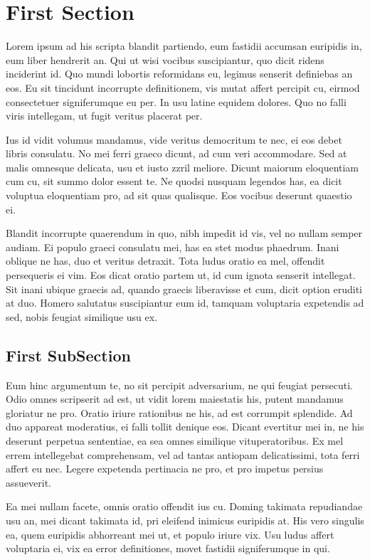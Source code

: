 \section{First Section \label{sec:sec1}}
Lorem ipsum ad his scripta blandit partiendo, eum fastidii accumsan euripidis in, eum liber hendrerit an. Qui ut wisi vocibus suscipiantur, quo dicit ridens inciderint id. Quo mundi lobortis reformidans eu, legimus senserit definiebas an eos. Eu sit tincidunt incorrupte definitionem, vis mutat affert percipit cu, eirmod consectetuer signiferumque eu per. In usu latine equidem dolores. Quo no falli viris intellegam, ut fugit veritus placerat per.

Ius id vidit volumus mandamus, vide veritus democritum te nec, ei eos debet libris consulatu. No mei ferri graeco dicunt, ad cum veri accommodare. Sed at malis omnesque delicata, usu et iusto zzril meliore. Dicunt maiorum eloquentiam cum cu, sit summo dolor essent te. Ne quodsi nusquam legendos has, ea dicit voluptua eloquentiam pro, ad sit quas qualisque. Eos vocibus deserunt quaestio ei.

Blandit incorrupte quaerendum in quo, nibh impedit id vis, vel no nullam semper audiam. Ei populo graeci consulatu mei, has ea stet modus phaedrum. Inani oblique ne has, duo et veritus detraxit. Tota ludus oratio ea mel, offendit persequeris ei vim. Eos dicat oratio partem ut, id cum ignota senserit intellegat. Sit inani ubique graecis ad, quando graecis liberavisse et cum, dicit option eruditi at duo. Homero salutatus suscipiantur eum id, tamquam voluptaria expetendis ad sed, nobis feugiat similique usu ex.

\subsection{First SubSection \label{sec:sub1}}
Eum hinc argumentum te, no sit percipit adversarium, ne qui feugiat persecuti. Odio omnes scripserit ad est, ut vidit lorem maiestatis his, putent mandamus gloriatur ne pro. Oratio iriure rationibus ne his, ad est corrumpit splendide. Ad duo appareat moderatius, ei falli tollit denique eos. Dicant evertitur mei in, ne his deserunt perpetua sententiae, ea sea omnes similique vituperatoribus. Ex mel errem intellegebat comprehensam, vel ad tantas antiopam delicatissimi, tota ferri affert eu nec. Legere expetenda pertinacia ne pro, et pro impetus persius assueverit.

Ea mei nullam facete, omnis oratio offendit ius cu. Doming takimata repudiandae usu an, mei dicant takimata id, pri eleifend inimicus euripidis at. His vero singulis ea, quem euripidis abhorreant mei ut, et populo iriure vix. Usu ludus affert voluptaria ei, vix ea error definitiones, movet fastidii signiferumque in qui.

